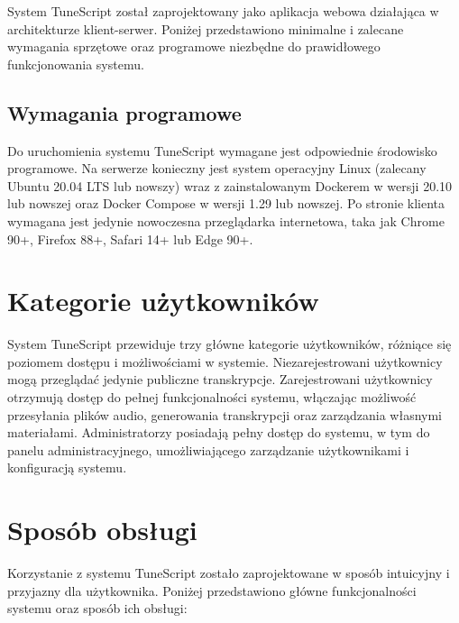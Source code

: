 \documentclass[a4paper,twoside,12pt]{book}
\begin{document}
System TuneScript został zaprojektowany jako aplikacja webowa działająca w architekturze klient-serwer. Poniżej przedstawiono minimalne i zalecane wymagania sprzętowe oraz programowe niezbędne do prawidłowego funkcjonowania systemu.

\subsection{Wymagania programowe}
Do uruchomienia systemu TuneScript wymagane jest odpowiednie środowisko programowe. Na serwerze konieczny jest system operacyjny Linux (zalecany Ubuntu 20.04 LTS lub nowszy) wraz z zainstalowanym Dockerem w wersji 20.10 lub nowszej oraz Docker Compose w wersji 1.29 lub nowszej. Po stronie klienta wymagana jest jedynie nowoczesna przeglądarka internetowa, taka jak Chrome 90+, Firefox 88+, Safari 14+ lub Edge 90+.

\section{Kategorie użytkowników}

System TuneScript przewiduje trzy główne kategorie użytkowników, różniące się poziomem dostępu i możliwościami w systemie. Niezarejestrowani użytkownicy mogą przeglądać jedynie publiczne transkrypcje. Zarejestrowani użytkownicy otrzymują dostęp do pełnej funkcjonalności systemu, włączając możliwość przesyłania plików audio, generowania transkrypcji oraz zarządzania własnymi materiałami. Administratorzy posiadają pełny dostęp do systemu, w tym do panelu administracyjnego, umożliwiającego zarządzanie użytkownikami i konfiguracją systemu.

\section{Sposób obsługi}

Korzystanie z systemu TuneScript zostało zaprojektowane w sposób intuicyjny i przyjazny dla użytkownika. Poniżej przedstawiono główne funkcjonalności systemu oraz sposób ich obsługi:
\end{document}
